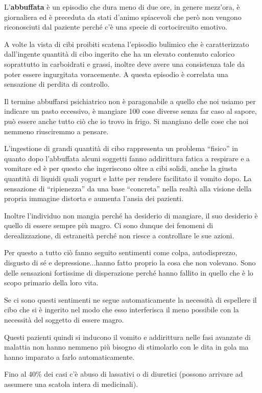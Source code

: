\documentclass[]{article}
\begin{document}
L'\textbf{abbuffata} è un episodio che dura meno di due ore, in genere
mezz'ora, è giornaliera ed è preceduta da stati d'animo spiacevoli che
però non vengono riconosciuti dal paziente perché c'è una specie di
cortocircuito emotivo.

A volte la vista di cibi proibiti scatena l'episodio bulimico che è
caratterizzato dall'ingente quantità di cibo ingerito che ha un elevato
contenuto calorico soprattutto in carboidrati e grassi, inoltre deve
avere una consistenza tale da poter essere ingurgitata voracemente. A
questa episodio è correlata una sensazione di perdita di controllo.

Il termine abbuffarsi psichiatrico non è paragonabile a quello che noi
usiamo per indicare un pasto eccessivo, è mangiare 100 cose diverse
senza far caso al sapore, può essere anche tutto ciò che io trovo in
frigo. Si mangiano delle cose che noi nemmeno riusciremmo a pensare.

L'ingestione di grandi quantità di cibo rappresenta un problema
``fisico'' in quanto dopo l'abbuffata alcuni soggetti fanno addirittura
fatica a respirare e a vomitare ed è per questo che ingeriscono oltre a
cibi solidi, anche la giusta quantità di liquidi quali yogurt e latte
per rendere facilitato il vomito dopo. La sensazione di ``ripienezza''
da una base ``concreta'' nella realtà alla visione della propria
immagine distorta e aumenta l'ansia dei pazienti.

Inoltre l'individuo non mangia perché ha desiderio di mangiare, il suo
desiderio è quello di essere sempre più magro. Ci sono dunque dei
fenomeni di derealizzazione, di estraneità perché non riesce a
controllare le sue azioni.

Per questo a tutto ciò fanno seguito sentimenti come colpa,
autodisprezzo, disgusto di sé e depressione...hanno fatto proprio la
cosa che non volevano. Sono delle sensazioni fortissime di disperazione
perché hanno fallito in quello che è lo scopo primario della loro vita.

Se ci sono questi sentimenti ne segue automaticamente la necessità di
espellere il cibo che si è ingerito nel modo che esso interferisca il
meno possibile con la necessità del soggetto di essere magro.

Questi pazienti quindi si inducono il vomito e addirittura nelle fasi
avanzate di malattia non hanno nemmeno più bisogno di stimolarlo con le
dita in gola ma hanno imparato a farlo automaticamente.

Fino al 40\% dei casi c'è abuso di lassativi o di diuretici (possono
arrivare ad assumere una scatola intera di medicinali).
\end{document}
